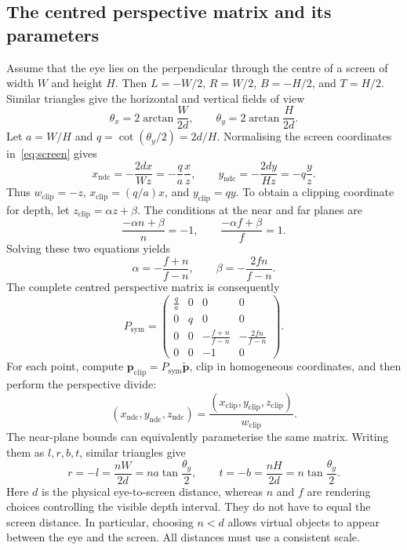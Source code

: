 \documentclass[11pt,a4paper]{article}
\newcommand{\vect}[1]{\boldsymbol{#1}}
\newcommand{\ndc}{\mathrm{ndc}}
\newcommand{\clip}{\mathrm{clip}}
\numberwithin{equation}{section}
\begin{document}
\subsection{The centred perspective matrix and its parameters}
Assume that the eye lies on the perpendicular through the centre of a screen of width $W$ and height $H$. Then $L=-W/2$, $R=W/2$, $B=-H/2$, and $T=H/2$. Similar triangles give the horizontal and vertical fields of view
\begin{equation}
\theta_x=2\arctan\frac{W}{2d},\qquad
\theta_y=2\arctan\frac{H}{2d}.
\end{equation}
Let $a=W/H$ and $q=\cot(\theta_y/2)=2d/H$. Normalising the screen coordinates in~\eqref{eq:screen} gives
\begin{equation}
x_{\ndc}=-\frac{2dx}{Wz}=-\frac{q}{a}\frac{x}{z},\qquad
y_{\ndc}=-\frac{2dy}{Hz}=-q\frac{y}{z}.
\end{equation}
Thus $w_{\clip}=-z$, $x_{\clip}=(q/a)x$, and $y_{\clip}=qy$. To obtain a clipping coordinate for depth, let $z_{\clip}=\alpha z+\beta$. The conditions at the near and far planes are
\begin{equation}
\frac{-\alpha n+\beta}{n}=-1,\qquad
\frac{-\alpha f+\beta}{f}=1.
\end{equation}
Solving these two equations yields
\begin{equation}
\alpha=-\frac{f+n}{f-n},\qquad \beta=-\frac{2fn}{f-n}.
\end{equation}
The complete centred perspective matrix is consequently
\begin{equation}\label{eq:symmetric}
P_{\mathrm{sym}}=\begin{pmatrix}
\frac{q}{a}&0&0&0\\
0&q&0&0\\
0&0&-\frac{f+n}{f-n}&-\frac{2fn}{f-n}\\
0&0&-1&0
\end{pmatrix}.
\end{equation}
For each point, compute $\vect p_{\clip}=P_{\mathrm{sym}}\widetilde{\vect p}$, clip in homogeneous coordinates, and then perform the perspective divide:
\begin{equation}
(x_{\ndc},y_{\ndc},z_{\ndc})=
\frac{(x_{\clip},y_{\clip},z_{\clip})}{w_{\clip}}.
\end{equation}
The near-plane bounds can equivalently parameterise the same matrix. Writing them as $l,r,b,t$, similar triangles give
\begin{equation}\label{eq:centerbounds}
r=-l=\frac{nW}{2d}=na\tan\frac{\theta_y}{2},\qquad
t=-b=\frac{nH}{2d}=n\tan\frac{\theta_y}{2}.
\end{equation}
Here $d$ is the physical eye-to-screen distance, whereas $n$ and $f$ are rendering choices controlling the visible depth interval. They do not have to equal the screen distance. In particular, choosing $n<d$ allows virtual objects to appear between the eye and the screen. All distances must use a consistent scale.
\end{document}
